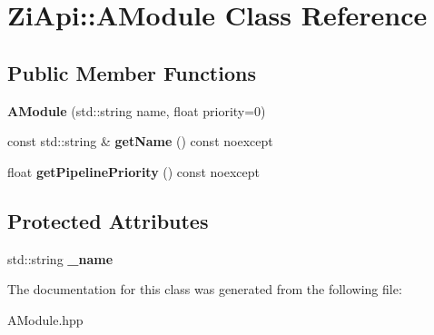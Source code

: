 \hypertarget{classZiApi_1_1AModule}{}\section{Zi\+Api\+::A\+Module Class Reference}
\label{classZiApi_1_1AModule}
\subsection*{Public Member Functions}
\begin{DoxyCompactItemize}
\item 
\mbox{\label{classZiApi_1_1AModule_a0bf8b25204069c54fbc066c4a88e5cc1}} 
{\bfseries A\+Module} (std\+::string name, float priority=0)
\item 
\mbox{\label{classZiApi_1_1AModule_a712422d83f3b777743e8a172070ab93b}} 
const std\+::string \& {\bfseries get\+Name} () const noexcept
\item 
\mbox{\label{classZiApi_1_1AModule_ae69cd2148f6774468800f844475dfa5b}} 
float {\bfseries get\+Pipeline\+Priority} () const noexcept
\end{DoxyCompactItemize}
\subsection*{Protected Attributes}
\begin{DoxyCompactItemize}
\item 
\mbox{\label{classZiApi_1_1AModule_aebccda3a3db6f2bd26ecca1c0f2167e7}} 
std\+::string {\bfseries \+\_\+name}
\end{DoxyCompactItemize}


The documentation for this class was generated from the following file\+:\begin{DoxyCompactItemize}
\item 
A\+Module.\+hpp\end{DoxyCompactItemize}
